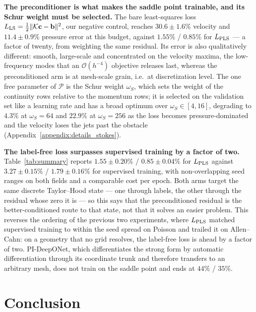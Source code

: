 \documentclass{article} %
\begin{document}
\textbf{The preconditioner is what makes the saddle point trainable, and its Schur weight must be selected.} The bare least-squares loss $L_\textup{LS} = \tfrac12\|\mathcal K \mathbf c - \mathbf b\|^2$, our negative control, reaches $30.6 \pm 1.6\%$ velocity and $11.4 \pm 0.9\%$ pressure error at this budget, against $1.55\%$ / $0.85\%$ for $L_\textup{PLS}$ --- a factor of twenty, from weighting the same residual. Its error is also qualitatively different: smooth, large-scale and concentrated on the velocity maxima, the low-frequency modes that an $\mathcal O(h^{-4})$ objective releases last, whereas the preconditioned arm is at mesh-scale grain, i.e.\ at discretization level. The one free parameter of $\mathcal P$ is the Schur weight $\omega_S$, which sets the weight of the continuity rows relative to the momentum rows; it is selected on the validation set like a learning rate and has a broad optimum over $\omega_S \in [4, 16]$, degrading to $4.3\%$ at $\omega_S = 64$ and $22.9\%$ at $\omega_S = 256$ as the loss becomes pressure-dominated and the velocity loses the jets past the obstacle (Appendix~\ref{appendix:details_stokes}).

\textbf{The label-free loss surpasses supervised training by a factor of two.} Table~\ref{tab:summary} reports $1.55 \pm 0.20\%$ / $0.85 \pm 0.04\%$ for $L_\textup{PLS}$ against $3.27 \pm 0.15\%$ / $1.79 \pm 0.16\%$ for supervised training, with non-overlapping seed ranges on both fields and a comparable cost per epoch. Both arms target the same discrete Taylor--Hood state --- one through labels, the other through the residual whose zero it is --- so this says that the preconditioned residual is the better-conditioned route to that state, not that it solves an easier problem. This reverses the ordering of the previous two experiments, where $L_\textup{PLS}$ matched supervised training to within the seed spread on Poisson and trailed it on Allen--Cahn: on a geometry that no grid resolves, the label-free loss is ahead by a factor of two. PI-DeepONet, which differentiates the strong form by automatic differentiation through its coordinate trunk and therefore transfers to an arbitrary mesh, does not train on the saddle point and ends at $44\%$ / $35\%$.

\section{Conclusion}


\end{document}
